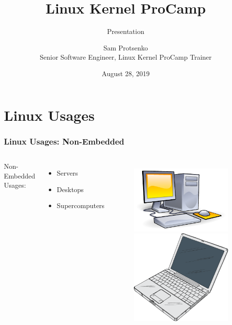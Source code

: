 \documentclass[aspectratio=169]{beamer}
\title{Linux Kernel ProCamp}
\subtitle{Presentation}
\author{Sam Protsenko \\ Senior Software Engineer, Linux Kernel ProCamp Trainer}
\date{\vspace*{5mm}August 28, 2019}
\institute{GlobalLogic}
\begin{document}
\maketitle


\section{Linux Usages}

\begin{frame}
  \frametitle{Linux Usages: Non-Embedded}
  \begin{columns}
    Non-Embedded Usages:
      \begin{itemize}
        \item Servers
        \item Desktops
        \item Supercomputers
      \end{itemize}
    \begin{figure}
      \centering
      \includegraphics[scale=0.7]{images/pc.pdf}
      \includegraphics[scale=0.25]{images/laptop.pdf}

\end{figure}
\end{columns}
\end{frame}
\end{document}

